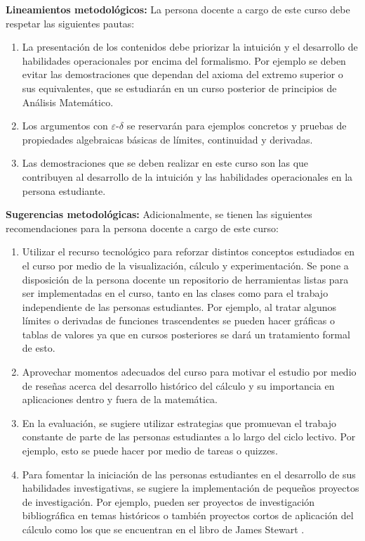 \begin{refsection}
\noindent \textbf{Lineamientos metodológicos:} La persona docente a cargo de este curso debe respetar las siguientes pautas:
\begin{enumerate}
    \item La presentación de los contenidos debe priorizar la intuición y el desarrollo de habilidades operacionales por encima del formalismo. Por ejemplo se deben evitar las demostraciones que dependan del axioma del extremo superior o sus equivalentes, que se estudiarán en un curso posterior de principios de Análisis Matemático.
    \item Los argumentos con $\varepsilon$-$\delta$ se reservarán para  ejemplos concretos y pruebas de propiedades algebraicas básicas de límites, continuidad y derivadas.
    \item Las demostraciones que se deben realizar en este curso son las que contribuyen al desarrollo de la intuición y las habilidades operacionales en la persona estudiante.
\end{enumerate}

\textbf{Sugerencias metodológicas:} Adicionalmente, se tienen las siguientes recomendaciones para la persona docente a cargo de este curso:
\begin{enumerate}
    \item Utilizar el recurso tecnológico para reforzar distintos conceptos estudiados en el curso por medio de la visualización, cálculo y experimentación. Se pone a disposición de la persona docente un repositorio de herramientas listas para ser implementadas en el curso, tanto en las clases como para el trabajo independiente de las personas estudiantes. Por ejemplo, al tratar algunos límites o derivadas de funciones trascendentes se pueden hacer gráficas o tablas de valores ya que en cursos posteriores se dará un tratamiento formal de esto.
    \item Aprovechar momentos adecuados del curso para motivar el estudio por medio de reseñas acerca del desarrollo histórico del cálculo y su importancia en aplicaciones dentro y fuera de la matemática.
    \item En la evaluación, se sugiere utilizar estrategias que promuevan el trabajo constante de parte de las personas estudiantes a lo largo del ciclo lectivo. Por ejemplo, esto se puede hacer por medio de tareas o quizzes.
    \item Para fomentar la iniciación de las personas estudiantes en el desarrollo de sus habilidades investigativas, se sugiere la implementación de pequeños proyectos de investigación. Por ejemplo, pueden ser proyectos de investigación bibliográfica en temas históricos o también proyectos cortos de aplicación del cálculo como los que se encuentran en el libro de James Stewart \cite{Ste18}.
\end{enumerate}





\end{refsection}
